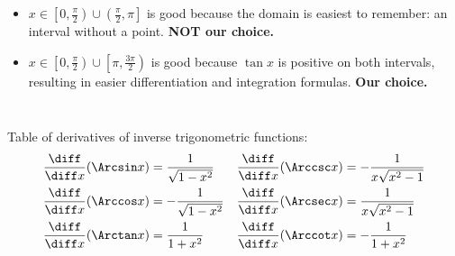 \begin{frame}
\begin{columns}
\begin{itemize}
\item<6-> $x\in \left[0, \frac{\pi}{2}\right)\cup\left(\frac{\pi}{2}, \pi \right] $ is good because the domain is easiest to remember: an interval without a point. \textbf{NOT our choice.}

\item<7,8,9,10-> $x\in \left[0, \frac{\pi}{2} \right) \cup \left[\pi,\frac{3\pi}{2} \right) $ is  good because $\tan x$ is positive on both intervals, resulting in easier differentiation and integration formulas. \textbf{Our choice.}

\end{itemize}
\end{columns}

\end{frame}

\begin{frame}
Table of derivatives of inverse trigonometric functions:
\begin{align*}
\frac{\diff}{\diff x} (\Arcsin x) & = %
\frac{1}{\sqrt{1-x^2}} &%
\frac{\diff}{\diff x} (\Arccsc x) & = %
-\frac{1}{x\sqrt{x^2-1}} \\%
\frac{\diff}{\diff x} (\Arccos x) & = %
-\frac{1}{\sqrt{1-x^2}} &%
\frac{\diff}{\diff x} (\Arcsec x) & = %
\frac{1}{x\sqrt{x^2-1}} \\%
\frac{\diff}{\diff x} (\Arctan x) & = %
\frac{1}{1+x^2} &%
\frac{\diff}{\diff x} (\Arccot x) & = %
-\frac{1}{1+x^2} %
\end{align*}
\end{frame}
